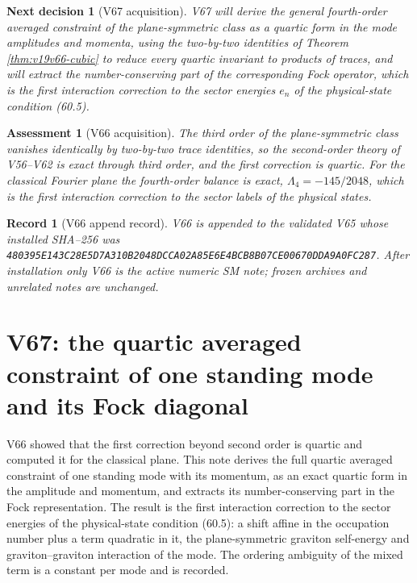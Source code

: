 \documentclass[11pt]{article}
\newtheorem{decision}[theorem]{Next decision}
\newtheorem{assessment}[theorem]{Assessment}
\newtheorem{record}[theorem]{Record}
\theoremstyle{remark}
\begin{document}
\begin{decision}[V67 acquisition]
\label{dec:v19v66-next}
V67 will derive the general fourth-order averaged constraint of the
plane-symmetric class as a quartic form in the mode amplitudes and
momenta, using the two-by-two identities of Theorem
\ref{thm:v19v66-cubic} to reduce every quartic invariant to products
of traces, and will extract the number-conserving part of the
corresponding Fock operator, which is the first interaction correction
to the sector energies \(e_n\) of the physical-state condition (60.5).
\end{decision}

\begin{assessment}[V66 acquisition]
\label{ass:v19v66}
The third order of the plane-symmetric class vanishes identically by
two-by-two trace identities, so the second-order theory of V56--V62 is
exact through third order, and the first correction is quartic.  For
the classical Fourier plane the fourth-order balance is exact,
\(\Lambda_4=-145/2048\), which is the first interaction correction to
the sector labels of the physical states.
\end{assessment}

\begin{record}[V66 append record]
\label{rec:v19v66}
V66 is appended to the validated V65 whose installed SHA--256 was
\texttt{480395E143C28E5D7A310B2048DCCA02A85E6E4BCB8B07CE00670DDA9A0FC287}.
After installation only V66 is the active numeric SM note; frozen
archives and unrelated notes are unchanged.
\end{record}


\section{V67: the quartic averaged constraint of one standing mode and its Fock diagonal}
\label{sec:v19v67}

V66 showed that the first correction beyond second order is quartic
and computed it for the classical plane.  This note derives the full
quartic averaged constraint of one standing mode with its momentum, as
an exact quartic form in the amplitude and momentum, and extracts its
number-conserving part in the Fock representation.  The result is the
first interaction correction to the sector energies of the
physical-state condition (60.5): a shift affine in the occupation
number plus a term quadratic in it, the plane-symmetric
graviton self-energy and graviton--graviton interaction of the mode.
The ordering ambiguity of the mixed term is a constant per mode and is
recorded.
\end{document}
